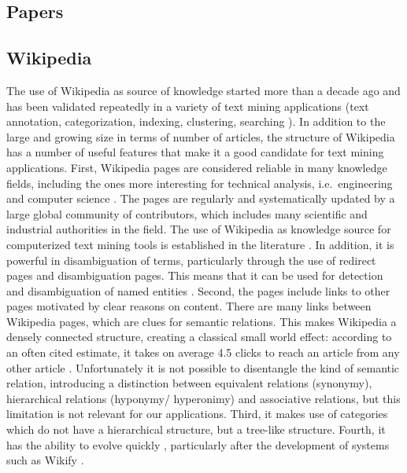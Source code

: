\documentclass[]{book}
\begin{document}
\subsection{Papers}\label{sotadocumentspapers}

\subsection{Wikipedia}\label{sotadocumentswiki}

The use of Wikipedia as source of knowledge started more than a decade
ago and has been validated repeatedly in a variety of text mining
applications (text annotation, categorization, indexing, clustering,
searching \citep{milne2008learning}). In addition to the large and
growing size in terms of number of articles, the structure of Wikipedia
has a number of useful features that make it a good candidate for text
mining applications. First, Wikipedia pages are considered reliable in
many knowledge fields, including the ones more interesting for technical
analysis, i.e.~engineering and computer science \citep{xu2015improving}.
The pages are regularly and systematically updated by a large global
community of contributors, which includes many scientific and industrial
authorities in the field. The use of Wikipedia as knowledge source for
computerized text mining tools is established in the literature
\citep{ferragina2012fast}. In addition, it is powerful in disambiguation
of terms, particularly through the use of redirect pages and
disambiguation pages. This means that it can be used for detection and
disambiguation of named entities \citep{bunescu2006using}. Second, the
pages include links to other pages motivated by clear reasons on
content. There are many links between Wikipedia pages, which are clues
for semantic relations. This makes Wikipedia a densely connected
structure, creating a classical small world effect: according to an
often cited estimate, it takes on average 4.5 clicks to reach an article
from any other article \citep{dolan2008six}. Unfortunately it is not
possible to disentangle the kind of semantic relation, introducing a
distinction between equivalent relations (synonymy), hierarchical
relations (hyponymy/ hyperonimy) and associative relations, but this
limitation is not relevant for our applications. Third, it makes use of
categories which do not have a hierarchical structure, but a tree-like
structure. Fourth, it has the ability to evolve quickly
\citep{lih2004wikipedia}, particularly after the development of systems
such as Wikify \citep[\citet{cheng2013relational}]{mihalcea2007wikify}.
\end{document}
